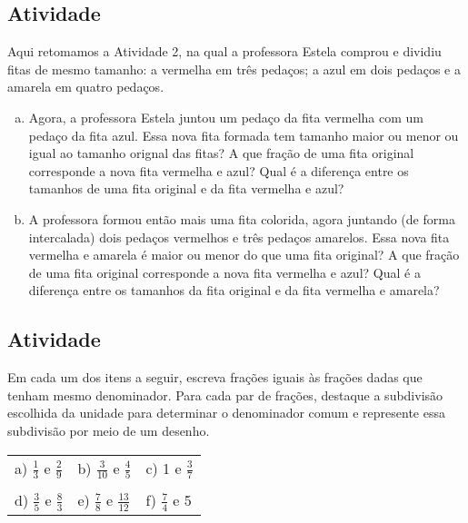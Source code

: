 \documentclass[a4,12pt]{book}
\begin{document}
\subsection{Atividade}

Aqui retomamos a Atividade 2, na qual a professora Estela comprou e dividiu fitas de mesmo tamanho: a vermelha em três pedaços; a azul em dois pedaços e a amarela em quatro pedaços. 


\begin{center}
\end{center}


\begin{enumerate}[a)]
  \item  Agora, a professora Estela juntou um pedaço da fita vermelha com um pedaço da fita azul. Essa nova fita formada tem tamanho maior ou menor ou igual ao tamanho orignal das fitas? A que fração de uma fita original corresponde a nova fita vermelha e azul? Qual é a diferença entre os tamanhos de uma fita original e da fita vermelha e azul?
  \item  A professora formou então mais uma fita colorida, agora juntando (de forma intercalada) dois pedaços vermelhos e três pedaços amarelos. Essa nova fita vermelha e amarela é maior ou menor do que uma fita original? A que fração de uma fita original corresponde a nova fita vermelha e azul? Qual é a diferença entre os tamanhos da fita original e da fita vermelha e amarela?
\end{enumerate}


\subsection{Atividade}


Em cada um dos itens a seguir, escreva frações iguais às frações dadas que tenham mesmo denominador. Para cada par de frações, destaque a subdivisão escolhida da unidade para determinar o denominador comum e represente essa subdivisão por meio de um desenho.

\begin{center}
  \begin{tabular}{m{}m{}m{}}
    
     a) $\frac{1}{3}$ e $\frac{2}{9}$  &   b) $\frac{3}{10}$ e $\frac{4}{5}$  &   c) 1 e $\frac{3}{7}$  \\
     \\
     d) $\frac{3}{5}$ e $\frac{8}{3}$  &   e) $\frac{7}{8}$ e $\frac{13}{12}$  &  f) $\frac{7}{4}$ e 5     
  \end{tabular}
\end{center}
\end{document}

